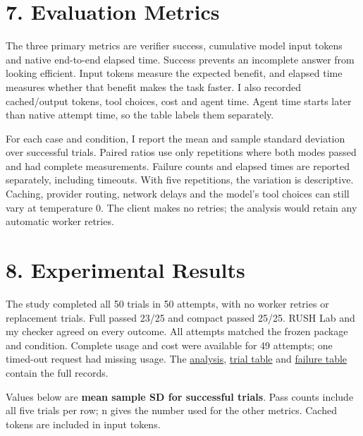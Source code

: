 \documentclass[10pt,letterpaper]{article}
\begin{document}
\section*{7. Evaluation Metrics}

The three primary metrics are verifier success, cumulative model input tokens and native end-to-end elapsed time. Success prevents an incomplete answer from looking efficient. Input tokens measure the expected benefit, and elapsed time measures whether that benefit makes the task faster. I also recorded cached/output tokens, tool choices, cost and agent time. Agent time starts later than native attempt time, so the table labels them separately.

For each case and condition, I report the mean and sample standard deviation over successful trials. Paired ratios use only repetitions where both modes passed and had complete measurements. Failure counts and elapsed times are reported separately, including timeouts. With five repetitions, the variation is descriptive. Caching, provider routing, network delays and the model's tool choices can still vary at temperature 0. The client makes no retries; the analysis would retain any automatic worker retries.

\section*{8. Experimental Results}

The study completed all 50 trials in 50 attempts, with no worker retries or replacement trials. Full passed 23/25 and compact passed 25/25. RUSH Lab and my checker agreed on every outcome. All attempts matched the frozen package and condition. Complete usage and cost were available for 49 attempts; one timed-out request had missing usage. The \href{https://github.com/a-little-hoof/580-final/blob/main/study/controlled/final/analysis/analysis.json}{analysis}, \href{https://github.com/a-little-hoof/580-final/blob/main/study/controlled/final/analysis/trials.csv}{trial table} and \href{https://github.com/a-little-hoof/580-final/blob/main/study/controlled/final/analysis/failures.csv}{failure table} contain the full records.

Values below are \textbf{mean \textpm{} sample SD for successful trials}. Pass counts include all five trials per row; n gives the number used for the other metrics. Cached tokens are included in input tokens.
\end{document}
